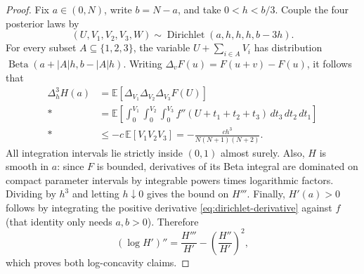 \documentclass[11pt]{article}
\newcommand{\E}{\mathbb E}
\DeclareMathOperator{\Beta}{Beta}
\theoremstyle{definition}
\begin{document}
\begin{proof}
Fix $a\in(0,N)$, write $b=N-a$, and take $0<h<b/3$. Couple the four
posterior laws by
\begin{equation*}
(U,V_1,V_2,V_3,W)\sim\operatorname{Dirichlet}(a,h,h,h,b-3h).
\end{equation*}
For every subset $A\subseteq\{1,2,3\}$, the variable
$U+\sum_{i\in A}V_i$ has distribution $\Beta(a+|A|h,b-|A|h)$.
Writing $\Delta_vF(u)=F(u+v)-F(u)$, it follows that
\begin{align*}
\Delta_h^3 H(a)
&=\E[\Delta_{V_1}\Delta_{V_2}\Delta_{V_3}F(U)]\\*
&=\E\left[\int_0^{V_1}\int_0^{V_2}\int_0^{V_3}
f''(U+t_1+t_2+t_3)\,dt_3\,dt_2\,dt_1\right]\\*
&\leq-c\,\E[V_1V_2V_3]
=-\frac{ch^3}{N(N+1)(N+2)}.
\end{align*}
All integration intervals lie strictly inside $(0,1)$ almost surely.
Also, $H$ is smooth in $a$: since $F$ is bounded, derivatives of its
Beta integral are dominated on compact parameter intervals by integrable
powers times logarithmic factors. Dividing by $h^3$ and letting
$h\downarrow0$ gives the bound on $H'''$.
Finally, $H'(a)>0$ follows by integrating the positive derivative
\eqref{eq:dirichlet-derivative} against $f$ (that identity only needs
$a,b>0$). Therefore
\begin{equation*}
(\log H')''=\frac{H'''}{H'}-\left(\frac{H''}{H'}\right)^2,
\end{equation*}
which proves both log-concavity claims.
\end{proof}
\end{document}
